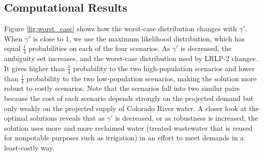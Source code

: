 \documentclass[11pt]{article}
\begin{document}
\subsection{Computational Results}

Figure \ref{fig:worst_case} shows how the worst-case distribution changes with $\gamma'$.
When $\gamma'$ is close to $1$, we use the maximum likelihood distribution, which has equal $\tfrac{1}{4}$ probabilities on each of the four scenarios.
As $\gamma'$ is decreased, the ambiguity set increases, and the worst-case distribution used by LRLP-2 changes.
It gives higher than $\tfrac{1}{4}$ probability to the two high-population scenarios and lower than $\tfrac{1}{4}$ probability to the two low-population scenarios, making the solution more robust to costly scenarios.
Note that the scenarios fall into two similar pairs because the cost of each scenario depends strongly on the projected demand but only weakly on the projected supply of Colorado River water.
A closer look at the optimal solutions reveals that as $\gamma'$ is decreased, or as robustness is increased, the solution uses more and more reclaimed water (treated wastewater that is reused for nonpotable purposes such as irrigation) in an effort to meet demands in a least-costly way.
\end{document}
